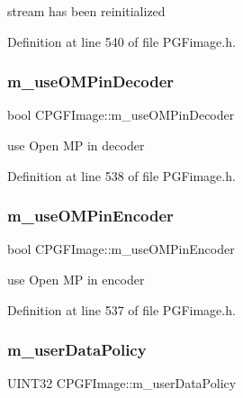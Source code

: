 stream has been reinitialized 



Definition at line 540 of file P\+G\+Fimage.\+h.

\mbox{\label{classCPGFImage_a01d0752d97900040fa1db7f02d4770cb}} 
\subsubsection{\texorpdfstring{m\_useOMPinDecoder}{m\_useOMPinDecoder}}
{\footnotesize\ttfamily bool C\+P\+G\+F\+Image\+::m\+\_\+use\+O\+M\+Pin\+Decoder\hspace{0.3cm}{\ttfamily [protected]}}



use Open MP in decoder 



Definition at line 538 of file P\+G\+Fimage.\+h.

\mbox{\label{classCPGFImage_a140110570c6d492b23db50189d3f4d48}} 
\subsubsection{\texorpdfstring{m\_useOMPinEncoder}{m\_useOMPinEncoder}}
{\footnotesize\ttfamily bool C\+P\+G\+F\+Image\+::m\+\_\+use\+O\+M\+Pin\+Encoder\hspace{0.3cm}{\ttfamily [protected]}}



use Open MP in encoder 



Definition at line 537 of file P\+G\+Fimage.\+h.

\mbox{\label{classCPGFImage_a18e28eef51d17c3bd0be4d4f758a6a86}} 
\subsubsection{\texorpdfstring{m\_userDataPolicy}{m\_userDataPolicy}}
{\footnotesize\ttfamily U\+I\+N\+T32 C\+P\+G\+F\+Image\+::m\+\_\+user\+Data\+Policy\hspace{0.3cm}{\ttfamily [protected]}}




